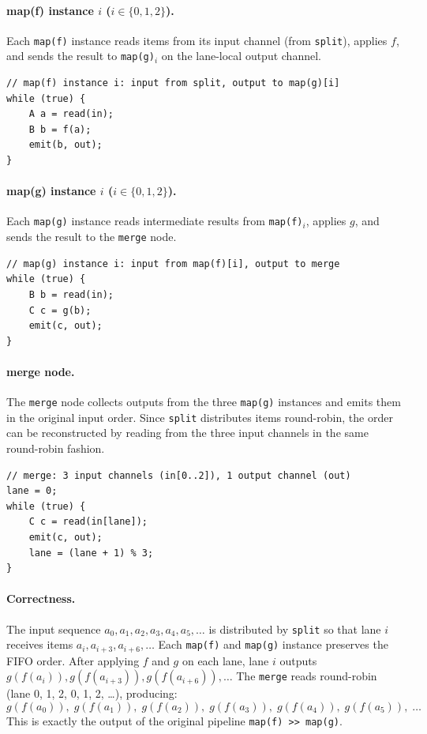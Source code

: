 \documentclass[11pt]{article}
\newcommand{\mnt}[1]{{\small\texttt{#1}}}
\theoremstyle{definition}
\begin{document}
\paragraph{map(f) instance $i$ ($i \in \{0, 1, 2\}$).} Each \mnt{map(f)} instance reads items from its input channel (from \mnt{split}), applies $f$, and sends the result to \mnt{map(g)}$_i$ on the lane-local output channel.

\begin{verbatim}
// map(f) instance i: input from split, output to map(g)[i]
while (true) {
    A a = read(in);
    B b = f(a);
    emit(b, out);
}
\end{verbatim}

\paragraph{map(g) instance $i$ ($i \in \{0, 1, 2\}$).} Each \mnt{map(g)} instance reads intermediate results from \mnt{map(f)}$_i$, applies $g$, and sends the result to the \mnt{merge} node.

\begin{verbatim}
// map(g) instance i: input from map(f)[i], output to merge
while (true) {
    B b = read(in);
    C c = g(b);
    emit(c, out);
}
\end{verbatim}

\paragraph{merge node.} The \mnt{merge} node collects outputs from the three \mnt{map(g)} instances and emits them in the original input order. Since \mnt{split} distributes items round-robin, the order can be reconstructed by reading from the three input channels in the same round-robin fashion.

\begin{verbatim}
// merge: 3 input channels (in[0..2]), 1 output channel (out)
lane = 0;
while (true) {
    C c = read(in[lane]);
    emit(c, out);
    lane = (lane + 1) % 3;
}
\end{verbatim}

\paragraph{Correctness.} The input sequence $a_0, a_1, a_2, a_3, a_4, a_5, \ldots$ is distributed by \mnt{split} so that lane $i$ receives items $a_i, a_{i+3}, a_{i+6}, \ldots$ Each \mnt{map(f)} and \mnt{map(g)} instance preserves the FIFO order. After applying $f$ and $g$ on each lane, lane $i$ outputs $g(f(a_i)), g(f(a_{i+3})), g(f(a_{i+6})), \ldots$ The \mnt{merge} reads round-robin (lane 0, 1, 2, 0, 1, 2, \ldots), producing:
\[
	g(f(a_0)),\; g(f(a_1)),\; g(f(a_2)),\; g(f(a_3)),\; g(f(a_4)),\; g(f(a_5)),\; \ldots
\]
This is exactly the output of the original pipeline \mnt{map(f) >> map(g)}.
\end{document}

